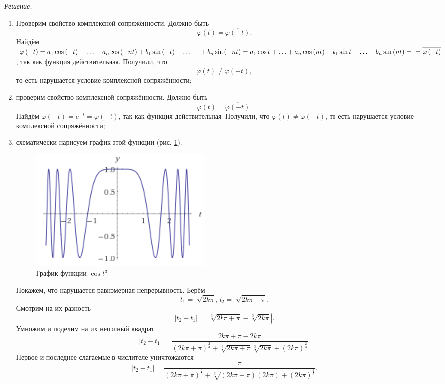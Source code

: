 \textit{Решение.}
\begin{enumerate}[label=\alph*)]
\item Проверим свойство комплексной сопряжённости.
Должно быть
$$ \varphi \left( t \right) =
  \overline{ \varphi \left( - t \right) }.$$
Найдём
$ \varphi \left( - t \right) =
  a_1 \cos \left( - t \right) + \dotsc + a_n \cos \left( - nt \right) +
  b_1 \sin \left( - t \right) + \dotsc + \\
  + b_n \sin \left( - nt \right) =
  a_1 \cos t + \dotsc + a_n \cos \left( nt \right) - b_1 \sin t - \dotsc -
  b_n \sin \left( nt \right) = \\
  = \overline{ \varphi \left( - t \right) }$,
так как функция действительная.
Получили, что
$$ \varphi \left( t \right) \neq
  \overline{ \varphi \left( - t \right) },$$
то есть нарушается условие комплексной сопряжённости;
\item проверим свойство комплексной сопряжённости.
Должно быть
$$ \varphi \left( t \right) =
  \overline{ \varphi \left( - t \right) }.$$
Найдём $ \varphi \left( - t \right) = e^{-t} = \overline{ \varphi \left( - t \right) }$,
так как функция действительная.
Получили, что $ \varphi \left( t \right) \neq \overline{ \varphi \left( - t \right) }$,
то есть нарушается условие комплексной сопряжённости;
\item схематически нарисуем график этой функции (рис. \ref{fig:1519}).

\begin{figure}[h!]
  \centering
  \includegraphics[width=.4\textwidth]{./pictures/15_19.png}
  \caption{График функции $ \cos t^3$}
  \label{fig:1519}
\end{figure}

Покажем, что нарушается равномерная непрерывность.
Берём
$$t_1 = \sqrt[3]{2k \pi }, \,
  t_2 = \sqrt[3]{2k \pi + \pi }.$$
Смотрим на их разность
$$ \left| t_2 - t_1 \right| =
  \left| \sqrt[3]{2k \pi + \pi } - \sqrt[3]{2k \pi } \right|.$$
Умножим и поделим на их неполный квадрат
$$ \left| t_2 - t_1 \right| =
  \frac{2k \pi + \pi - 2k \pi}{ \left( 2k \pi + \pi \right)^{ \frac{2}{3}} + \sqrt[3]{2k \pi + \pi }
  \sqrt[3]{2k \pi } + \left( 2k \pi \right)^{ \frac{2}{3}}}.$$
Первое и последнее слагаемые в числителе уничтожаются
$$ \left| t_2 - t_1 \right| =
  \frac{ \pi }{ \left( 2k \pi + \pi \right)^{ \frac{2}{3}} +
  \sqrt[3]{ \left( 2k \pi + \pi \right) \left( 2k \pi \right) } + \left( 2k \pi \right)^{ \frac{2}{3}}}.$$


\end{enumerate}
